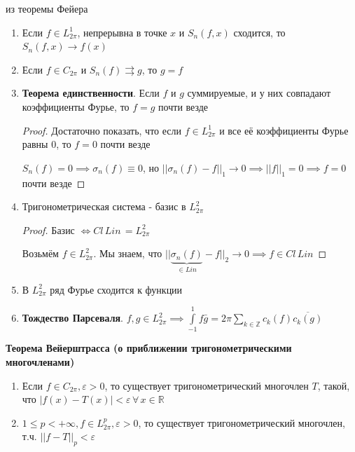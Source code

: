 \begin{consequence}
    из теоремы Фейера
    \begin{enumerate}
        \item {
            Если $f \in L_{2\pi}^1$, непрерывна в точке $x$ и $S_n (f, x)$ сходится, то $S_n (f, x) \rightarrow f(x)$
        }
        \item {
            Если $f \in C_{2\pi}$ и $S_n (f) \rightrightarrows g$, то $g = f$ 
        }
        \item {
            \textbf{Теорема единственности}. Если $f$ и $g$ суммируемые, и у них совпадают коэффициенты Фурье, то $f = g$ почти везде

            \begin{proof}
                Достаточно показать, что если $f \in L_{2\pi}^1$ и все её коэффициенты Фурье равны 0, то $f = 0$ почти везде

                $S_n (f) = 0 \implies \sigma_n (f) \equiv 0$, но $|| \sigma_n (f) - f ||_1 \rightarrow 0 \implies ||f||_1 = 0 \implies f = 0$ почти везде
            \end{proof}
        }
        \item {
            Тригонометрическая система - базис в $L_{2\pi}^2$

            \begin{proof}
                Базис $\Leftrightarrow Cl \, Lin \, = L_{2\pi}^2$

                Возьмём $f \in L_{2\pi}^2$. Мы знаем, что $|| \underbrace{\sigma_n (f)}_{\in Lin} - f ||_2 \rightarrow 0 \implies f \in Cl \, Lin $
            \end{proof}
        }
        \item {
            В $L_{2\pi}^2$ ряд Фурье сходится к функции
        }
        \item {
            \textbf{Тождество Парсеваля}. $f, g \in L_{2\pi}^2 \implies \int\limits_{-1}^1 f \bar{g} = 2\pi \sum\limits_{k \in \mathbb{Z}} c_k (f) \overline{c_k (g)}$ 
        }
    \end{enumerate}
\end{consequence}

\begin{theorem}
    \textbf{Теорема Вейерштрасса (о приближении тригонометрическими многочленами)}

    \begin{enumerate}
        \item {
            Если $f \in C_{2\pi}, \varepsilon > 0$, то существует тригонометрический многочлен $T$, такой, что $|f(x) - T(x)| < \varepsilon \, \forall \, x \in \mathbb{R}$
        }
        \item {
            $1 \leqslant p < +\infty, f \in L_{2\pi}^p, \varepsilon > 0$, то существует тригонометрический многочлен, т.ч. $||f - T||_p < \varepsilon$
        }
    \end{enumerate}
\end{theorem}


